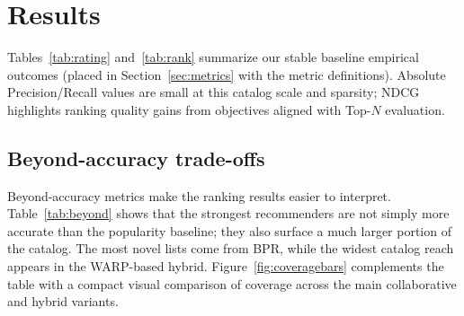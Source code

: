 \documentclass[sigconf,nonacm]{acmart}
\begin{document}
\section{Results}
Tables~\ref{tab:rating} and~\ref{tab:rank} summarize our stable baseline empirical outcomes (placed in Section~\ref{sec:metrics} with the metric definitions). Absolute Precision/Recall values are small at this catalog scale and sparsity; NDCG highlights ranking quality gains from objectives aligned with Top-$N$ evaluation.

\subsection{Beyond-accuracy trade-offs}
Beyond-accuracy metrics make the ranking results easier to interpret. Table~\ref{tab:beyond} shows that the strongest recommenders are not simply more accurate than the popularity baseline; they also surface a much larger portion of the catalog. The most novel lists come from BPR, while the widest catalog reach appears in the WARP-based hybrid. Figure~\ref{fig:coveragebars} complements the table with a compact visual comparison of coverage across the main collaborative and hybrid variants.

\begin{table}[t]
  \caption{Beyond-accuracy metrics from the completed full-data run. The main pattern is that hybrid reranking improves catalog coverage while keeping diversity high.}
  \label{tab:beyond}
  \centering
  \footnotesize
  \setlength{\tabcolsep}{4pt}
\end{table}
\end{document}
